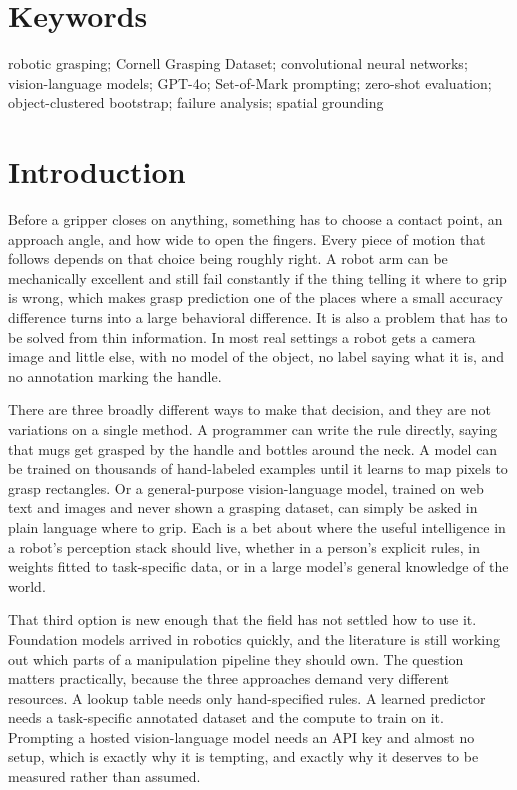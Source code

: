 \documentclass[12pt,letterpaper]{article}
\begin{document}
\section*{Keywords}
robotic grasping; Cornell Grasping Dataset; convolutional neural networks;
vision-language models; GPT-4o; Set-of-Mark prompting; zero-shot evaluation;
object-clustered bootstrap; failure analysis; spatial grounding

\section{Introduction}

Before a gripper closes on anything, something has to choose a contact
point, an approach angle, and how wide to open the fingers. Every piece
of motion that follows depends on that choice being roughly right. A
robot arm can be mechanically excellent and still fail constantly if
the thing telling it where to grip is wrong, which makes grasp
prediction one of the places where a small accuracy difference turns
into a large behavioral difference. It is also a problem that has to be
solved from thin information. In most real settings a robot gets a
camera image and little else, with no model of the object, no label
saying what it is, and no annotation marking the handle.

There are three broadly different ways to make that decision, and they
are not variations on a single method. A programmer can write the rule
directly, saying that mugs get grasped by the handle and bottles around
the neck. A model can be trained on thousands of hand-labeled examples
until it learns to map pixels to grasp rectangles. Or a general-purpose
vision-language model, trained on web text and images and never shown a
grasping dataset, can simply be asked in plain language where to grip.
Each is a bet about where the useful intelligence in a robot's
perception stack should live, whether in a person's explicit rules, in
weights fitted to task-specific data, or in a large model's general
knowledge of the world.

That third option is new enough that the field has not settled how to
use it. Foundation models arrived in robotics quickly, and the
literature is still working out which parts of a manipulation pipeline
they should own. The question matters practically, because the three
approaches demand very different resources. A lookup table needs only
hand-specified rules. A learned predictor needs a task-specific
annotated dataset and the compute to train on it. Prompting a hosted
vision-language model needs an API key and almost no setup, which is
exactly why it is tempting, and exactly why it deserves to be measured
rather than assumed.
\end{document}
